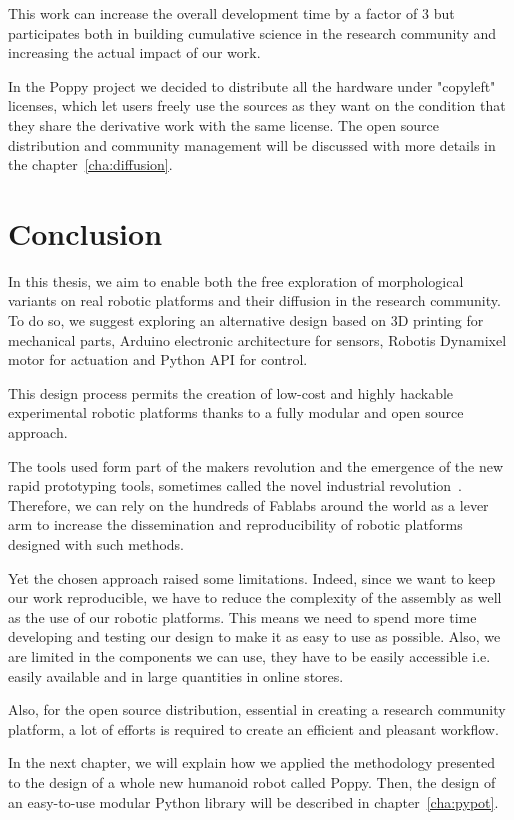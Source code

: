 This work can increase the overall development time by a factor of 3 but participates both in building cumulative science in the research community and increasing the actual impact of our work.

In the Poppy project we decided to distribute all the hardware under "copyleft" licenses, which let users freely use the sources as they want on the condition that they share the derivative work with the same license.
The open source distribution and community management will be discussed with more details in the chapter~\ref{cha:diffusion}.


\section{Conclusion} %

In this thesis, we aim to enable both the free exploration of morphological variants on real robotic platforms and their diffusion in the research community. To do so, we suggest exploring an alternative design based on 3D printing for mechanical parts, Arduino electronic architecture for sensors, Robotis Dynamixel motor for actuation and Python API for control.

This design process permits the creation of low-cost and highly hackable experimental robotic platforms thanks to a fully modular and open source approach.

The tools used form part of the makers revolution and the emergence of the new rapid prototyping tools, sometimes called the novel industrial revolution~\parencite{anderson2012makers}. Therefore, we can rely on the hundreds of Fablabs around the world as a lever arm to increase the dissemination and reproducibility of robotic platforms designed with such methods.

Yet the chosen approach raised some limitations. Indeed, since we want to keep our work reproducible, we have to reduce the complexity of the assembly as well as the use of our robotic platforms. This means we need to spend more time developing and testing our design to make it as easy to use as possible. Also, we are limited in the components we can use, they have to be easily accessible i.e. easily available and in large quantities in online stores.

Also, for the open source distribution, essential in creating a research community platform, a lot of efforts is required to create an efficient and pleasant workflow.

In the next chapter, we will explain how we applied the methodology presented to the design of a whole new humanoid robot called Poppy. Then, the design of an easy-to-use modular Python library will be described in chapter~\ref{cha:pypot}.





